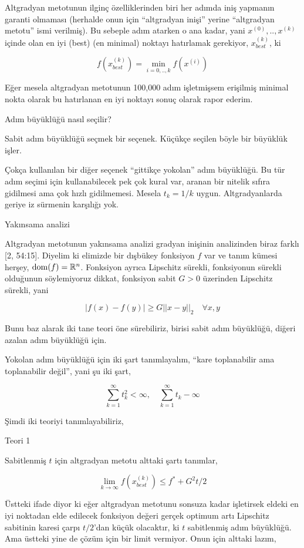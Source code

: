 \documentclass[12pt,fleqn]{article}\usepackage{../../common}
\begin{document}
Altgradyan metotunun ilginç özelliklerinden biri her adımda iniş yapmanın
garanti olmaması (herhalde onun için ``altgradyan inişi'' yerine
``altgradyan metotu'' ismi verilmiş). Bu sebeple adım atarken o ana kadar,
yani $x^{(0)},.., x^{(k)}$ içinde olan en iyi (best) (en minimal) noktayı
hatırlamak gerekiyor, $x_{best}^{(k)}$, ki 

$$
f(x_{best}^{(k)}) = \min_{i=0,..,k} f(x^{(i)})
$$

Eğer mesela altgradyan metotunun 100,000 adım işletmişsem erişilmiş minimal
nokta olarak bu hatırlanan en iyi noktayı sonuç olarak rapor ederim.

Adım büyüklüğü nasıl seçilir?

Sabit adım büyüklüğü seçmek bir seçenek. Küçükçe seçilen böyle bir
büyüklük işler. 

Çokça kullanılan bir diğer seçenek ``gittikçe yokolan'' adım büyüklüğü. Bu
tür adım seçimi için kullanabilecek pek çok kural var, aranan bir nitelik
sıfıra gidilmesi ama çok hızlı gidilmemesi. Mesela $t_k = 1/k$ uygun.
Altgradyanlarda geriye iz sürmenin karşılığı yok.

Yakınsama analizi

Altgradyan metotunun yakınsama analizi gradyan inişinin analizinden biraz
farklı [2, 54:15]. Diyelim ki elimizde bir dışbükey fonksiyon $f$ var ve
tanım kümesi herşey, $\operatorname{dom}(f) = \mathbb{R}^n$. Fonksiyon ayrıca Lipschitz
sürekli, fonksiyonun sürekli olduğunun söylemiyoruz dikkat, fonksiyon sabit
$G > 0$ üzerinden Lipschitz sürekli, yani

$$
|f(x) - f(y)| \ge G || x-y ||_2 \quad \forall x,y
$$

Bunu baz alarak iki tane teori öne sürebiliriz, birisi sabit adım
büyüklüğü, diğeri azalan adım büyüklüğü için.

Yokolan adım büyüklüğü için iki şart tanımlayalım, ``kare toplanabilir ama
toplanabilir değil'', yani şu iki şart,

$$
\sum_{k=1}^{\infty} t_k^2 < \infty, \quad \sum_{k=1}^{\infty} t_k - \infty
$$

Şimdi iki teoriyi tanımlayabiliriz,

Teori 1

Sabitlenmiş $t$ için altgradyan metotu alttaki şartı tanımlar, 

$$
\lim_{k \to \infty} f(x_{best}^{(k)} ) \le f^\ast + G^2 t / 2
$$

Üstteki ifade diyor ki eğer altgradyan metotunu sonsuza kadar işletirsek
eldeki en iyi noktadan elde edilecek fonksiyon değeri gerçek optimum artı
Lipschitz sabitinin karesi çarpı $t/2$'dan küçük olacaktır, ki $t$
sabitlenmiş adım büyüklüğü. Ama üstteki yine de çözüm için bir limit
vermiyor. Onun için alttaki lazım,
\end{document}
